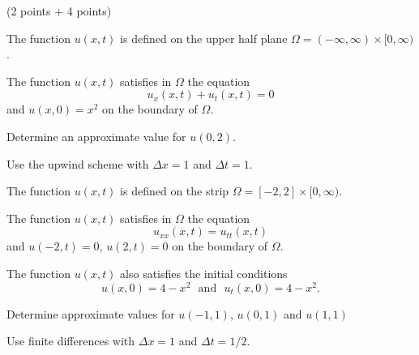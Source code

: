(2 points + 4 points)
\begin{teilaufgaben}
\item
The function $u(x,t)$ is defined on the upper half plane
$\Omega = (-\infty,\infty) \times [0,\infty)$.

The function $u(x,t)$ satisfies in $\Omega$ the equation
\[
u_{x}(x,t) + u_{t}(x,t) = 0
\]
and  $u(x,0) = x^2$ on the boundary of $\Omega$.

Determine an approximate value for $u(0,2)$. 

Use the upwind scheme with $\Delta x = 1$ and $\Delta t = 1.$

\item
The function $u(x,t)$ is defined on the strip
$\Omega = [-2, 2] \times [0,\infty)$.

The function $u(x,t)$ satisfies in $\Omega$ the equation
\[
u_{xx}(x,t) = u_{tt}(x,t)
\]
and  $u(-2,t) = 0$, $u(2,t) = 0$ on the boundary of $\Omega$. 

The function $u(x,t)$ also satisfies the initial conditions
\[
u(x,0) = 4 - x^2 \ \ \ \mbox{and} \ \ \ u_t(x,0) = 4 - x^2.
\]

Determine approximate values for $u(-1,1)$, $u(0,1)$ and $u(1,1)$  

Use finite differences with $\Delta x = 1$ and $\Delta t = 1/2.$
\end{teilaufgaben}


